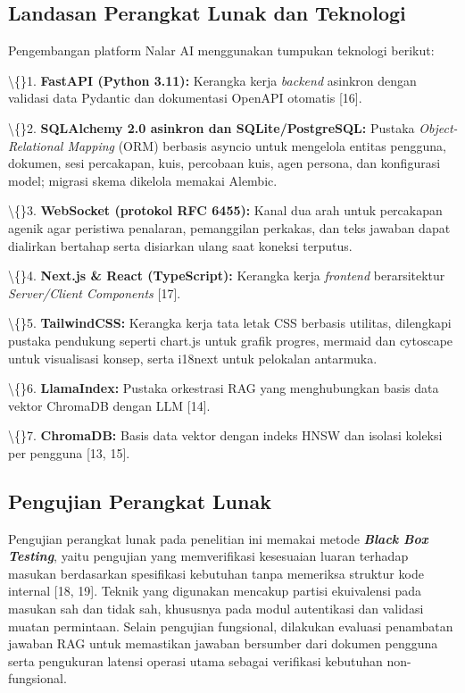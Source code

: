 \documentclass[12pt,a4paper]{article}
\begin{document}
\subsection*{Landasan Perangkat Lunak dan Teknologi}

Pengembangan platform Nalar AI menggunakan tumpukan teknologi berikut:



\textbackslash\{\}1. \textbf{FastAPI (Python 3.11):} Kerangka kerja \textit{backend} asinkron dengan validasi data Pydantic dan dokumentasi OpenAPI otomatis {[}16{]}.



\textbackslash\{\}2. \textbf{SQLAlchemy 2.0 asinkron dan SQLite/PostgreSQL:} Pustaka \textit{Object-Relational Mapping} (ORM) berbasis asyncio untuk mengelola entitas pengguna, dokumen, sesi percakapan, kuis, percobaan kuis, agen persona, dan konfigurasi model; migrasi skema dikelola memakai Alembic.



\textbackslash\{\}3. \textbf{WebSocket (protokol RFC 6455):} Kanal dua arah untuk percakapan agenik agar peristiwa penalaran, pemanggilan perkakas, dan teks jawaban dapat dialirkan bertahap serta disiarkan ulang saat koneksi terputus.



\textbackslash\{\}4. \textbf{Next.js \& React (TypeScript):} Kerangka kerja \textit{frontend} berarsitektur \textit{Server/Client Components} {[}17{]}.



\textbackslash\{\}5. \textbf{TailwindCSS:} Kerangka kerja tata letak CSS berbasis utilitas, dilengkapi pustaka pendukung seperti chart.js untuk grafik progres, mermaid dan cytoscape untuk visualisasi konsep, serta i18next untuk pelokalan antarmuka.



\textbackslash\{\}6. \textbf{LlamaIndex:} Pustaka orkestrasi RAG yang menghubungkan basis data vektor ChromaDB dengan LLM {[}14{]}.



\textbackslash\{\}7. \textbf{ChromaDB:} Basis data vektor dengan indeks HNSW dan isolasi koleksi per pengguna {[}13, 15{]}.



\subsection*{Pengujian Perangkat Lunak}

Pengujian perangkat lunak pada penelitian ini memakai metode \textbf{\textit{Black Box Testing}}, yaitu pengujian yang memverifikasi kesesuaian luaran terhadap masukan berdasarkan spesifikasi kebutuhan tanpa memeriksa struktur kode internal {[}18, 19{]}. Teknik yang digunakan mencakup partisi ekuivalensi pada masukan sah dan tidak sah, khususnya pada modul autentikasi dan validasi muatan permintaan. Selain pengujian fungsional, dilakukan evaluasi penambatan jawaban RAG untuk memastikan jawaban bersumber dari dokumen pengguna serta pengukuran latensi operasi utama sebagai verifikasi kebutuhan non-fungsional.
\end{document}

